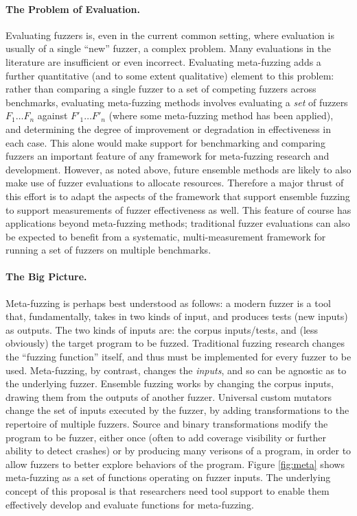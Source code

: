 \paragraph{The Problem of Evaluation.} Evaluating fuzzers is, even in the 
current common setting, where evaluation is usually of a single ``new'' fuzzer, 
a complex problem. Many evaluations in the literature are insufficient or even 
incorrect.  Evaluating meta-fuzzing adds a further quantitative (and to some 
extent qualitative) element to this problem: rather than comparing a single 
fuzzer to a set of competing fuzzers across benchmarks, evaluating meta-fuzzing 
methods involves evaluating a \emph{set} of fuzzers $F_1 \ldots F_n$ against 
$F'_1 \ldots F'_n$ (where some meta-fuzzing method has been applied), and 
determining the degree of improvement or degradation in effectiveness in each 
case.  This alone would make support for benchmarking and comparing fuzzers an 
important feature of any framework for meta-fuzzing research and development.  
However, as noted above, future ensemble methods are likely to also make use of 
fuzzer evaluations to allocate resources.  Therefore a major thrust of this 
effort is to adapt the aspects of the framework that support ensemble fuzzing 
to support measurements of fuzzer effectiveness as well.  This feature of 
course has applications beyond meta-fuzzing methods; traditional fuzzer 
evaluations can also be expected to benefit from a systematic, 
multi-measurement framework for running a set of fuzzers on multiple
benchmarks.



\paragraph{The Big Picture.}  Meta-fuzzing is perhaps best understood
as follows: a modern fuzzer is a tool that, fundamentally, takes in
two kinds of input, and produces tests (new inputs) as outputs.  The
two kinds of inputs are:  the corpus inputs/tests, and (less
obviously) the target program to be fuzzed.
Traditional fuzzing research changes the ``fuzzing function''
itself, and thus must be implemented for every fuzzer to be
used. Meta-fuzzing, by contrast, changes the \emph{inputs}, and so can
be agnostic as to the underlying fuzzer.   Ensemble fuzzing works by
changing the corpus inputs, drawing them from the outputs of another
fuzzer.  Universal custom mutators change the set of
inputs executed by the fuzzer, by adding transformations to the
repertoire of multiple fuzzers.  Source and binary transformations
modify the program to be fuzzer, either once (often to add coverage
visibility or further ability to detect crashes) or by producing many
verisons of a program, in order to allow fuzzers to better explore
behaviors of the program.  Figure \ref{fig:meta} shows meta-fuzzing as
a set of functions operating on fuzzer inputs.  The underlying concept
of this proposal is that researchers need tool support to enable them
effectively develop and evaluate functions for meta-fuzzing.

